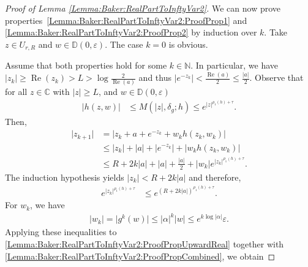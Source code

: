 \documentclass[10pt,a4paper]{amsart}
\newcommand{\D}{{\mathbb D}}
\renewcommand{\Re}{\operatorname{Re}}
\begin{document}
\begin{proof}[Proof of Lemma {\ref{Lemma:Baker:RealPartToInftyVar2}}]
	We can now prove properties~\eqref{Lemma:Baker:RealPartToInftyVar2:ProofProp1} and \eqref{Lemma:Baker:RealPartToInftyVar2:ProofProp2} by induction over $k$. Take  $z \in U_{r,R}$ and $ w \in \D(0,\varepsilon)$. The case $k=0$ is obvious.
	
	Assume that both properties hold for some $k\in\mathbb{N}$. In particular, we have $\lvert z_k \rvert \geq \Re(z_k) > L > \log \frac{2}{\Re(a)}$ and thus $\left\lvert e^{-z_k} \right\rvert < \frac{\Re(a)}{2} \leq \frac{\lvert a \rvert}{2} $. 
	Observe that for all $z \in \mathbb{C}$ with $\lvert z \rvert \geq L$, and $w \in \D(0,\varepsilon)$
	\begin{equation}
		\label{Lemma:Baker:RealPartToInftyVar2:ErrorEquation}
		\begin{split}
			\lvert h(z,w) \rvert &\leq M(\lvert z \rvert, \delta_g;h) \leq e^{\lvert z \rvert^{\rho_1(h) + \tau}}.
		\end{split}
	\end{equation}
	Then,
	\begin{equation}
		\label{Lemma:Baker:RealPartToInftyVar2:ProofPropUpwardReal}
		\begin{split}
			\lvert z_{k+1} \rvert &= \left\lvert z_k + a + e^{-z_k} + w_k h(z_k, w_k) \right\rvert \\
			&\leq \lvert z_{k} \rvert + \lvert a \rvert + \left\lvert e^{-z_k} \right\rvert + \lvert w_k h(z_k, w_k) \rvert \\
			&\leq R + 2k \lvert a \rvert + \lvert a \rvert +  \frac{\lvert a \rvert}{2} + \lvert w_k \rvert  e^{\lvert z_k \rvert^{\rho_1(h) + \tau}}.
		\end{split}
	\end{equation}
	The induction hypothesis yields $\lvert z_k \rvert < R + 2k \lvert a \rvert$ and therefore,
	\begin{equation*}
		\begin{split}
			e^{\lvert z_k \rvert^{\rho_1(h) + \tau}} &\leq e^{( R + 2k \lvert a \rvert )^{\rho_1(h) + \tau}}.
		\end{split}
	\end{equation*}
	For $w_k$, we have
	\begin{equation*}
		\begin{split}
			\lvert w_k \rvert = \lvert g^k(w) \rvert \leq \lvert \alpha \rvert^k \lvert w \rvert \leq e^{k \log \lvert \alpha \rvert} \varepsilon.
		\end{split}
	\end{equation*}
	Applying these inequalities to \eqref{Lemma:Baker:RealPartToInftyVar2:ProofPropUpwardReal} together with \eqref{Lemma:Baker:RealPartToInftyVar2:ProofPropCombined}, we obtain

\end{proof}
\end{document}
